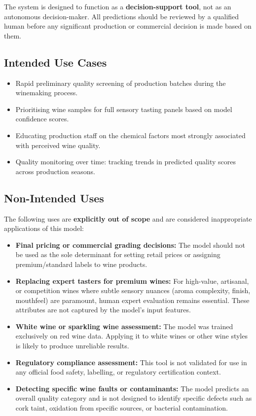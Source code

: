 \documentclass[11pt,a4paper]{article}
\begin{document}
The system is designed to function as a \textbf{decision-support tool}, not as an autonomous decision-maker. All predictions should be reviewed by a qualified human before any significant production or commercial decision is made based on them.

\subsection{Intended Use Cases}

\begin{itemize}[leftmargin=*]
    \item Rapid preliminary quality screening of production batches during the winemaking process.
    \item Prioritising wine samples for full sensory tasting panels based on model confidence scores.
    \item Educating production staff on the chemical factors most strongly associated with perceived wine quality.
    \item Quality monitoring over time: tracking trends in predicted quality scores across production seasons.
\end{itemize}

\subsection{Non-Intended Uses}

The following uses are \textbf{explicitly out of scope} and are considered inappropriate applications of this model:

\begin{itemize}[leftmargin=*]
    \item \textbf{Final pricing or commercial grading decisions:} The model should not be used as the sole determinant for setting retail prices or assigning premium/standard labels to wine products.
    \item \textbf{Replacing expert tasters for premium wines:} For high-value, artisanal, or competition wines where subtle sensory nuances (aroma complexity, finish, mouthfeel) are paramount, human expert evaluation remains essential. These attributes are not captured by the model's input features.
    \item \textbf{White wine or sparkling wine assessment:} The model was trained exclusively on red wine data. Applying it to white wines or other wine styles is likely to produce unreliable results.
    \item \textbf{Regulatory compliance assessment:} This tool is not validated for use in any official food safety, labelling, or regulatory certification context.
    \item \textbf{Detecting specific wine faults or contaminants:} The model predicts an overall quality category and is not designed to identify specific defects such as cork taint, oxidation from specific sources, or bacterial contamination.
\end{itemize}
\end{document}
